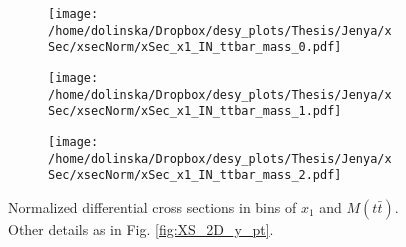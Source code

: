 \begin{figure}[H]
\centering
\begin{subfigure}
  \centering
  \texttt{[image: /home/dolinska/Dropbox/desy\_plots/Thesis/Jenya/xSec/xsecNorm/xSec\_x1\_IN\_ttbar\_mass\_0.pdf]}
\end{subfigure}
\begin{subfigure}
  \centering
  \texttt{[image: /home/dolinska/Dropbox/desy\_plots/Thesis/Jenya/xSec/xsecNorm/xSec\_x1\_IN\_ttbar\_mass\_1.pdf]}
\end{subfigure}
\begin{subfigure}
  \centering
  \texttt{[image: /home/dolinska/Dropbox/desy\_plots/Thesis/Jenya/xSec/xsecNorm/xSec\_x1\_IN\_ttbar\_mass\_2.pdf]}
\end{subfigure}
\caption{Normalized differential cross sections in bins of  $x_{1}$ and $M(t\bar{t})$. Other details as in Fig. \ref{fig:XS_2D_y_pt}.}
\label{fig:XS_2D_x1_Mtt}
\end{figure}

